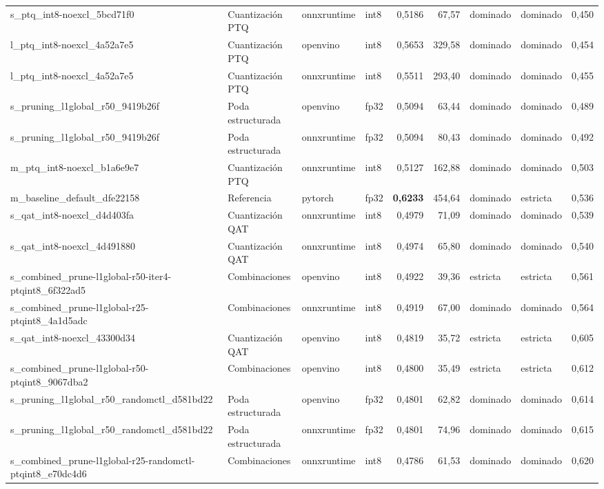 \begin{landscape}
\begin{table}[htbp]
\begin{adjustbox}{max width=\linewidth, max totalheight=\dimexpr\textheight-\ht\tfmedgetitle-\dp\tfmedgetitle-\ht\tfmedgenotes-\dp\tfmedgenotes-6pt\relax}
\begin{tabular}{llllrrllr}
    s\_ptq\_int8-noexcl\_5bcd71f0 & Cuantización PTQ & onnxruntime & int8 & 0,5186 & 67,57 & dominado & dominado & 0,450 \\
    l\_ptq\_int8-noexcl\_4a52a7e5 & Cuantización PTQ & openvino & int8 & 0,5653 & 329,58 & dominado & dominado & 0,454 \\
    l\_ptq\_int8-noexcl\_4a52a7e5 & Cuantización PTQ & onnxruntime & int8 & 0,5511 & 293,40 & dominado & dominado & 0,455 \\
    s\_pruning\_l1global\_r50\_9419b26f & Poda estructurada & openvino & fp32 & 0,5094 & 63,44 & dominado & dominado & 0,489 \\
    s\_pruning\_l1global\_r50\_9419b26f & Poda estructurada & onnxruntime & fp32 & 0,5094 & 80,43 & dominado & dominado & 0,492 \\
    m\_ptq\_int8-noexcl\_b1a6e9e7 & Cuantización PTQ & onnxruntime & int8 & 0,5127 & 162,88 & dominado & dominado & 0,503 \\
    m\_baseline\_default\_dfe22158 & Referencia & pytorch & fp32 & \textbf{0,6233} & 454,64 & dominado & estricta & 0,536 \\
    s\_qat\_int8-noexcl\_d4d403fa & Cuantización QAT & onnxruntime & int8 & 0,4979 & 71,09 & dominado & dominado & 0,539 \\
    s\_qat\_int8-noexcl\_4d491880 & Cuantización QAT & onnxruntime & int8 & 0,4974 & 65,80 & dominado & dominado & 0,540 \\
    s\_combined\_prune-l1global-r50-iter4-ptqint8\_6f322ad5 & Combinaciones & openvino & int8 & 0,4922 & 39,36 & estricta & estricta & 0,561 \\
    s\_combined\_prune-l1global-r25-ptqint8\_4a1d5adc & Combinaciones & onnxruntime & int8 & 0,4919 & 67,00 & dominado & dominado & 0,564 \\
    s\_qat\_int8-noexcl\_43300d34 & Cuantización QAT & openvino & int8 & 0,4819 & 35,72 & estricta & estricta & 0,605 \\
    s\_combined\_prune-l1global-r50-ptqint8\_9067dba2 & Combinaciones & openvino & int8 & 0,4800 & 35,49 & estricta & estricta & 0,612 \\
    s\_pruning\_l1global\_r50\_randomctl\_d581bd22 & Poda estructurada & openvino & fp32 & 0,4801 & 62,82 & dominado & dominado & 0,614 \\
    s\_pruning\_l1global\_r50\_randomctl\_d581bd22 & Poda estructurada & onnxruntime & fp32 & 0,4801 & 74,96 & dominado & dominado & 0,615 \\
    s\_combined\_prune-l1global-r25-randomctl-ptqint8\_e70dc4d6 & Combinaciones & onnxruntime & int8 & 0,4786 & 61,53 & dominado & dominado & 0,620 \\

\end{tabular}
\end{adjustbox}
\end{table}
\end{landscape}
